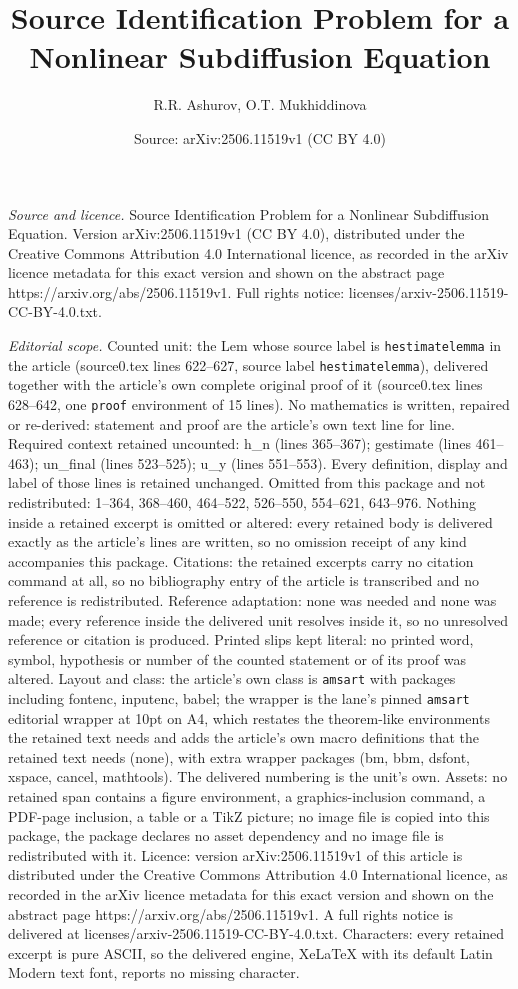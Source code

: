 \documentclass[10pt,a4paper]{amsart}
\title[Source Identification Problem for a Nonlinear Subdiffusion E]{Source Identification Problem for a Nonlinear Subdiffusion Equation}
\author{R.R. Ashurov, O.T. Mukhiddinova}
\date{Source: arXiv:2506.11519v1 (CC BY 4.0)}
\begin{document}
\maketitle

\noindent\emph{Source and licence.} Source Identification Problem for a Nonlinear Subdiffusion Equation. Version arXiv:2506.11519v1 (CC BY 4.0), distributed under the Creative Commons Attribution 4.0 International licence, as recorded in the arXiv licence metadata for this exact version and shown on the abstract page https://arxiv.org/abs/2506.11519v1. Full rights notice: licenses/arxiv-2506.11519-CC-BY-4.0.txt.\par\smallskip

\noindent\textit{Editorial scope.} Counted unit: the Lem whose source label is \texttt{hestimatelemma} in the article (source0.tex lines 622--627, source label \texttt{hestimatelemma}), delivered together with the article's own complete original proof of it (source0.tex lines 628--642, one \texttt{proof} environment of 15 lines). No mathematics is written, repaired or re-derived: statement and proof are the article's own text line for line. Required context retained uncounted: h\_n (lines 365--367); gestimate (lines 461--463); un\_final (lines 523--525); u\_y (lines 551--553). Every definition, display and label of those lines is retained unchanged. Omitted from this package and not redistributed: 1--364, 368--460, 464--522, 526--550, 554--621, 643--976. Nothing inside a retained excerpt is omitted or altered: every retained body is delivered exactly as the article's lines are written, so no omission receipt of any kind accompanies this package. Citations: the retained excerpts carry no citation command at all, so no bibliography entry of the article is transcribed and no reference is redistributed. Reference adaptation: none was needed and none was made; every reference inside the delivered unit resolves inside it, so no unresolved reference or citation is produced. Printed slips kept literal: no printed word, symbol, hypothesis or number of the counted statement or of its proof was altered. Layout and class: the article's own class is \texttt{amsart} with packages including fontenc, inputenc, babel; the wrapper is the lane's pinned \texttt{amsart} editorial wrapper at 10pt on A4, which restates the theorem-like environments the retained text needs and adds the article's own macro definitions that the retained text needs (none), with extra wrapper packages (bm, bbm, dsfont, xspace, cancel, mathtools). The delivered numbering is the unit's own. Assets: no retained span contains a figure environment, a graphics-inclusion command, a PDF-page inclusion, a table or a TikZ picture; no image file is copied into this package, the package declares no asset dependency and no image file is redistributed with it. Licence: version arXiv:2506.11519v1 of this article is distributed under the Creative Commons Attribution 4.0 International licence, as recorded in the arXiv licence metadata for this exact version and shown on the abstract page https://arxiv.org/abs/2506.11519v1. A full rights notice is delivered at licenses/arxiv-2506.11519-CC-BY-4.0.txt. Characters: every retained excerpt is pure ASCII, so the delivered engine, XeLaTeX with its default Latin Modern text font, reports no missing character.
\end{document}

